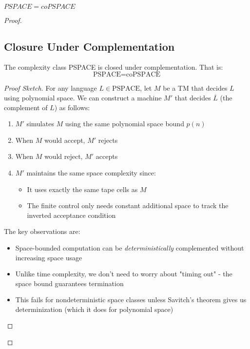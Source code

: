 \begin{theorem} $PSPACE = coPSPACE$\end{theorem}
\begin{proof}
    \subsection{Closure Under Complementation}

\begin{theorem}[PSPACE = coPSPACE]
The complexity class PSPACE is closed under complementation. That is:
\[
\text{PSPACE} = \text{coPSPACE}
\]
\end{theorem}

\begin{proof}[Proof Sketch]
For any language $L \in \text{PSPACE}$, let $M$ be a TM that decides $L$ using polynomial space. We can construct a machine $M'$ that decides $\overline{L}$ (the complement of $L$) as follows:

\begin{enumerate}
    \item $M'$ simulates $M$ using the same polynomial space bound $p(n)$
    \item When $M$ would accept, $M'$ rejects
    \item When $M$ would reject, $M'$ accepts
    \item $M'$ maintains the same space complexity since:
    \begin{itemize}
        \item It uses exactly the same tape cells as $M$
        \item The finite control only needs constant additional space to track the inverted acceptance condition
    \end{itemize}
\end{enumerate}

The key observations are:
\begin{itemize}
    \item Space-bounded computation can be \textit{deterministically} complemented without increasing space usage
    \item Unlike time complexity, we don't need to worry about "timing out" - the space bound guarantees termination
    \item This fails for nondeterministic space classes unless Savitch's theorem gives us determinization (which it does for polynomial space)
\end{itemize}
\end{proof}


\end{proof}
